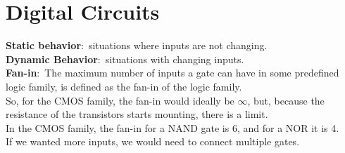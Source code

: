 \documentclass[nobib]{tufte-handout}
\newcommand{\defn}[2]{\noindent\textbf{#1}:\ #2}
\begin{document}
    \section{Digital Circuits}
    \defn{Static behavior}{situations where inputs are not changing.}\\
    \defn{Dynamic Behavior}{situations with changing inputs.}\\
    \defn{Fan-in}{The maximum number of inputs a gate can have in some predefined logic family, is defined as the fan-in of the logic family.}\\
    So, for the CMOS family, the fan-in would ideally be $\infty$, but, because the resistance of the transistors starts mounting, there is a limit.\\
In the CMOS family, the fan-in for a NAND gate is 6, and for a NOR it is 4.\\
If we wanted more inputs, we would need to connect multiple gates.\\
\end{document}
